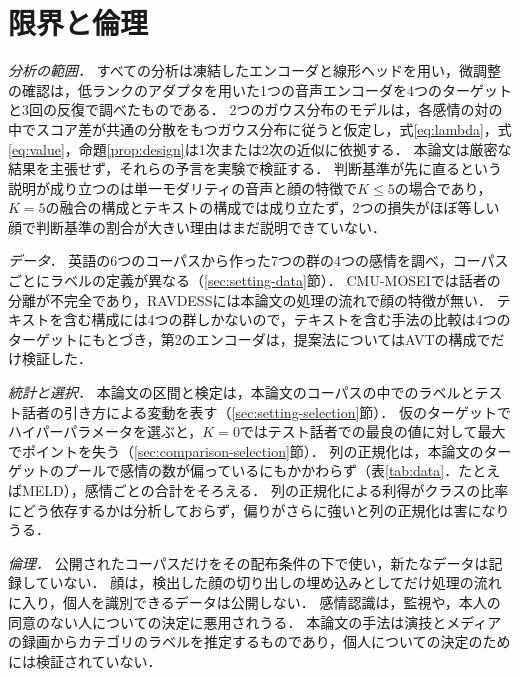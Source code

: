 \section{限界と倫理}
\label{sec:limitations-ethics}

\emph{分析の範囲．}
すべての分析は凍結したエンコーダと線形ヘッドを用い，微調整の確認は，低ランクのアダプタを用いた1つの音声エンコーダを4つのターゲットと3回の反復で調べたものである．
2つのガウス分布のモデルは，各感情の対の中でスコア差が共通の分散をもつガウス分布に従うと仮定し，式\eqref{eq:lambda}，式\eqref{eq:value}，命題\ref{prop:design}は1次または2次の近似に依拠する．
本論文は厳密な結果を主張せず，それらの予言を実験で検証する．
判断基準が先に直るという説明が成り立つのは単一モダリティの音声と顔の特徴で$K \le 5$の場合であり，$K=5$の融合の構成とテキストの構成では成り立たず，2つの損失がほぼ等しい顔で判断基準の割合が大きい理由はまだ説明できていない．

\emph{データ．}
英語の6つのコーパスから作った7つの群の4つの感情を調べ，コーパスごとにラベルの定義が異なる（\ref{sec:setting-data}節）．
CMU-MOSEIでは話者の分離が不完全であり，RAVDESSには本論文の処理の流れで顔の特徴が無い．
テキストを含む構成には4つの群しかないので，テキストを含む手法の比較は4つのターゲットにもとづき，第2のエンコーダは，提案法についてはAVTの構成でだけ検証した．

\emph{統計と選択．}
本論文の区間と検定は，本論文のコーパスの中でのラベルとテスト話者の引き方による変動を表す（\ref{sec:setting-selection}節）．
仮のターゲットでハイパーパラメータを選ぶと，$K=0$ではテスト話者での最良の値に対して最大でポイントを失う（\ref{sec:comparison-selection}節）．
列の正規化は，本論文のターゲットのプールで感情の数が偏っているにもかかわらず（表\ref{tab:data}．たとえばMELD），感情ごとの合計をそろえる．
列の正規化による利得がクラスの比率にどう依存するかは分析しておらず，偏りがさらに強いと列の正規化は害になりうる\cite{veilleux2021realistic}．

\emph{倫理．}
公開されたコーパスだけをその配布条件の下で使い，新たなデータは記録していない．
顔は，検出した顔の切り出しの埋め込みとしてだけ処理の流れに入り，個人を識別できるデータは公開しない．
感情認識は，監視や，本人の同意のない人についての決定に悪用されうる．
本論文の手法は演技とメディアの録画からカテゴリのラベルを推定するものであり，個人についての決定のためには検証されていない．
